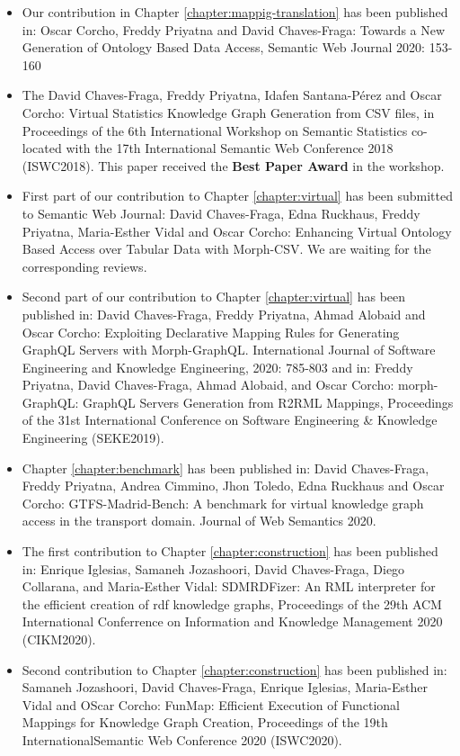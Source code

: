 \begin{itemize}
    \item Our contribution in Chapter \ref{chapter:mappig-translation} has been published in: Oscar Corcho, Freddy Priyatna and David Chaves-Fraga: Towards a New Generation of Ontology Based Data Access, Semantic Web Journal 2020: 153-160
    \item The  David Chaves-Fraga, Freddy Priyatna, Idafen Santana-Pérez and Oscar Corcho: Virtual Statistics Knowledge Graph Generation from CSV files, in Proceedings of the 6th International Workshop on Semantic Statistics co-located with the 17th International Semantic Web Conference 2018 (ISWC2018). This paper received the \textbf{Best Paper Award} in the workshop.
    \item First part of our contribution to Chapter \ref{chapter:virtual} has been submitted to Semantic Web Journal: David Chaves-Fraga, Edna Ruckhaus, Freddy Priyatna, Maria-Esther Vidal and Oscar Corcho: Enhancing Virtual Ontology Based Access over Tabular Data with Morph-CSV. We are waiting for the corresponding reviews.
    \item Second part of our contribution to Chapter \ref{chapter:virtual} has been published in: David Chaves-Fraga, Freddy Priyatna, Ahmad Alobaid and Oscar Corcho: Exploiting Declarative Mapping Rules for Generating GraphQL Servers with Morph-GraphQL. International Journal of Software Engineering and Knowledge Engineering, 2020: 785-803 and in: Freddy Priyatna, David Chaves-Fraga, Ahmad Alobaid, and Oscar Corcho: morph-GraphQL: GraphQL Servers Generation from R2RML Mappings, Proceedings of the 31st International Conference on Software Engineering \& Knowledge Engineering (SEKE2019).
    \item Chapter \ref{chapter:benchmark} has been published in: David Chaves-Fraga, Freddy Priyatna, Andrea Cimmino, Jhon Toledo, Edna Ruckhaus and Oscar Corcho: GTFS-Madrid-Bench: A benchmark for virtual knowledge graph access in the transport domain. Journal of Web Semantics 2020.
    \item The first contribution to Chapter \ref{chapter:construction} has been published in: Enrique Iglesias, Samaneh Jozashoori, David Chaves-Fraga, Diego Collarana, and Maria-Esther Vidal: SDMRDFizer: An RML interpreter for the efficient creation of rdf knowledge graphs, Proceedings of the 29th ACM International Conferrence on Information and Knowledge Management 2020 (CIKM2020).
    \item Second contribution to Chapter \ref{chapter:construction} has been published in: Samaneh Jozashoori, David Chaves-Fraga, Enrique Iglesias, Maria-Esther Vidal and OScar Corcho: FunMap: Efficient Execution of Functional Mappings for Knowledge Graph Creation, Proceedings of the 19th InternationalSemantic Web Conference 2020 (ISWC2020).

\end{itemize}
